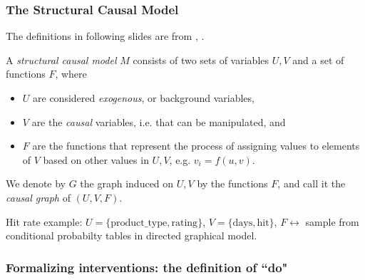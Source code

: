 \begin{frame}
    \frametitle{The Structural Causal Model}
    The definitions in following slides are from \cite{pearl2007mathematics}, \cite{pearl2016causal}.
\begin{definition}
    A \emph{structural causal model} $M$ consists of two sets of variables $U, V$ and a set of functions $F$, where 
    
    \begin{itemize}
        \item $U$ are considered \emph{exogenous}, or background variables, 
        \item $V$ are the \emph{causal} variables, i.e. that can be manipulated, and
        \item $F$ are the functions that represent the process of assigning values to elements of $V$ based on other values in $U, V$, e.g. $v_i = f(u, v)$.
    \end{itemize}

    We denote by $G$ the graph induced on $U, V$ by the functions $F$, and call it the \emph{causal graph} of $(U, V, F)$.\newline
\end{definition}

Hit rate example: $U = \{\textrm{product\_type}, \textrm{rating}\}$, $V= \{\textrm{days}, \textrm{hit}\}$, $F\leftrightarrow$ sample from conditional probabilty tables in directed graphical model.
\end{frame}

\begin{frame}
    \frametitle{Formalizing interventions: the definition of ``do"}
\end{frame}


\begin{frame}
\frametitle{}
\end{frame}


